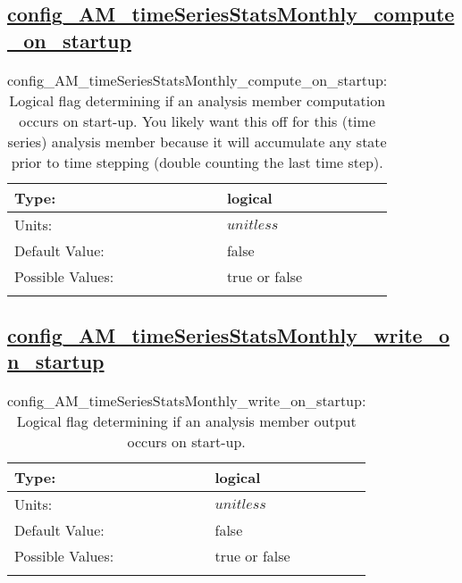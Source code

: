 \subsection[config\_AM\_timeSeriesStatsMonthly\_compute\_on\_startup]{\hyperref[sec:nm_tab_AM_timeSeriesStatsMonthly]{config\_AM\_timeSeriesStatsMonthly\_compute\_on\_startup}}
\label{subsec:nm_sec_config_AM_timeSeriesStatsMonthly_compute_on_startup}
\begin{center}
\begin{longtable}{| p{2.0in} || p{4.0in} |}
    \hline
    Type: & logical \\
    \hline
    Units: & $unitless$ \\
    \hline
    Default Value: & false \\
    \hline
    Possible Values: & true or false \\
    \hline
    \caption{config\_AM\_timeSeriesStatsMonthly\_compute\_on\_startup: Logical flag determining if an analysis member computation occurs on start-up. You likely want this off for this (time series) analysis member because it will accumulate any state prior to time stepping (double counting the last time step).}
\end{longtable}
\end{center}
\subsection[config\_AM\_timeSeriesStatsMonthly\_write\_on\_startup]{\hyperref[sec:nm_tab_AM_timeSeriesStatsMonthly]{config\_AM\_timeSeriesStatsMonthly\_write\_on\_startup}}
\label{subsec:nm_sec_config_AM_timeSeriesStatsMonthly_write_on_startup}
\begin{center}
\begin{longtable}{| p{2.0in} || p{4.0in} |}
    \hline
    Type: & logical \\
    \hline
    Units: & $unitless$ \\
    \hline
    Default Value: & false \\
    \hline
    Possible Values: & true or false \\
    \hline
    \caption{config\_AM\_timeSeriesStatsMonthly\_write\_on\_startup: Logical flag determining if an analysis member output occurs on start-up.}
\end{longtable}
\end{center}
